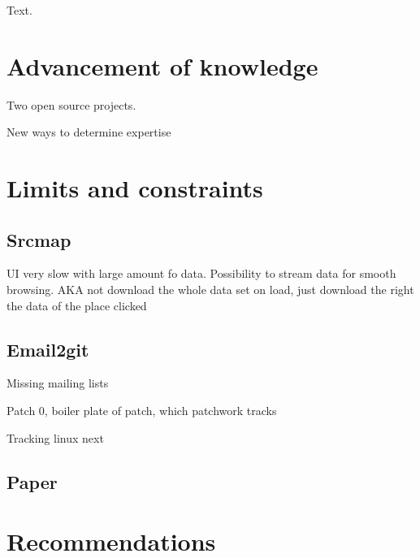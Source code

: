 \label{sec:Conclusion}
Text.


\section{Advancement of knowledge}


Two open source projects.

New ways to determine expertise


\section{Limits and constraints}
\label{sec:Limits and constraints}



\subsection{Srcmap}

UI very slow with large amount fo data. Possibility to stream data for smooth browsing. AKA not download the whole data set on load, just download the right the data of the place clicked



\subsection{Email2git}

Missing mailing lists

Patch 0, boiler plate of patch, which patchwork tracks

Tracking linux next




\subsection{Paper}







\section{Recommendations}

